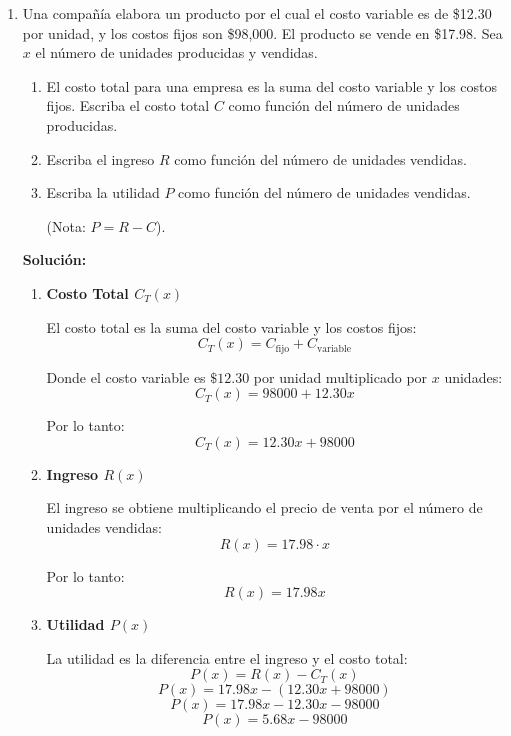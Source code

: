 \documentclass[12pt]{article}
\begin{document}
\begin{enumerate}[label=\alph*.-]
    \item Una compañía elabora un producto por el cual el costo variable es de \$12.30 por unidad, y los costos fijos son \$98,000. El producto se vende en \$17.98. Sea $x$ el número de unidades producidas y vendidas.
    \begin{enumerate}[label=\roman*.]
        \item El costo total para una empresa es la suma del costo variable y los costos fijos. Escriba el costo total $C$ como función del número de unidades producidas.
        \item Escriba el ingreso $R$ como función del número de unidades vendidas.
        \item Escriba la utilidad $P$ como función del número de unidades vendidas.
        
        (Nota: $P = R - C$).
    \end{enumerate}
    
    \textbf{Solución:}
    
    \begin{enumerate}[label=\roman*.]
        \item \textbf{Costo Total $C_T(x)$}
        
        El costo total es la suma del costo variable y los costos fijos:
        \[C_T(x) = C_{\text{fijo}} + C_{\text{variable}}\]
        
        Donde el costo variable es $\$12.30$ por unidad multiplicado por $x$ unidades:
        \[C_T(x) = 98000 + 12.30x\]
        
        Por lo tanto: \[\boxed{C_T(x) = 12.30x + 98000}\]
        
        \item \textbf{Ingreso $R(x)$}
        
        El ingreso se obtiene multiplicando el precio de venta por el número de unidades vendidas:
        \[R(x) = 17.98 \cdot x\]
        
        Por lo tanto: \[\boxed{R(x) = 17.98x}\]
        
        \item \textbf{Utilidad $P(x)$}
        
        La utilidad es la diferencia entre el ingreso y el costo total:
        \[P(x) = R(x) - C_T(x)\]
        \[P(x) = 17.98x - (12.30x + 98000)\]
        \[P(x) = 17.98x - 12.30x - 98000\]
        \[P(x) = 5.68x - 98000\]
        

\end{enumerate}
\end{enumerate}
\end{document}
